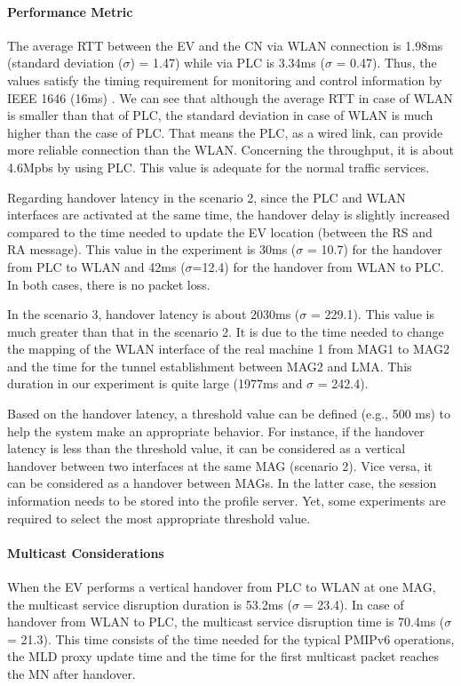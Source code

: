 \paragraph{Performance Metric}
The average RTT between the EV and the CN via WLAN connection is 1.98ms (standard deviation ($\sigma$) = 1.47) while via PLC is 3.34ms ($\sigma$ = 0.47). Thus, the values satisfy the timing requirement for monitoring and control information by IEEE 1646 (16ms) \cite{communication_smartgrid}. We can see that although the average RTT in case of WLAN is smaller than that of PLC, the standard deviation in case of WLAN is much higher than the case of PLC. That means the PLC, as a wired link, can provide more reliable connection than the WLAN. Concerning the 
throughput, it is about 4.6Mpbs by using PLC. This value is adequate for the normal traffic services.
 
Regarding handover latency in the scenario 2, since the PLC and WLAN interfaces are activated at the same time, the handover delay is slightly increased compared to the time needed to update the EV location (between the RS and RA message). This value in the experiment is 30ms ($\sigma$ = 10.7) for the handover from PLC to WLAN and 42ms ($\sigma$=12.4) for the handover from WLAN to PLC. In both cases, there is no packet loss. 

In the scenario 3, handover latency is about 2030ms ($\sigma$ = 229.1). This value is much greater than that in the scenario 2. It is due to the time needed to change the mapping of the WLAN interface of the real machine 1 from MAG1 to MAG2 and the time for the tunnel establishment between MAG2 and LMA. This duration in our experiment is quite large (1977ms and $\sigma$ = 242.4).

Based on the handover latency, a threshold value can be defined (e.g., 500 ms) to help the system make an appropriate behavior. For instance, if the handover latency is less than the threshold value, it can be considered as a vertical handover between two interfaces at the same MAG (scenario 2). Vice versa, it can be considered as a handover between MAGs. In the latter case, the session information needs to be stored into the profile server. Yet, some experiments are required to select the most appropriate threshold value.
\paragraph{Multicast Considerations}
When the EV performs a vertical handover from PLC to WLAN at one MAG, the multicast service disruption duration is 53.2ms ($\sigma$ = 23.4). In case of handover from WLAN to PLC, the multicast service disruption time is 70.4ms ($\sigma$ = 21.3). This time consists of the time needed for the typical PMIPv6 operations, the MLD proxy update time and the time for the first multicast packet reaches the MN after handover. 

